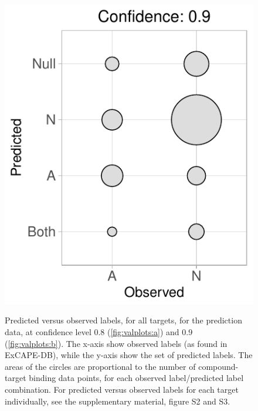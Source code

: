 \documentclass[utf8]{frontiersSCNS} %
\begin{document}
\begin{figure}[h!]
\begin{minipage}[c]{0.38\textwidth}
{        \includegraphics[width=1\textwidth]{figures/fig4b_alltargets_0p9_valplot.pdf}
    }\label{fig:valplots:b}
\end{minipage}
    \caption{Predicted versus observed labels, for all targets, for the
    prediction data, at confidence level 0.8 (\ref{fig:valplots:a}) and 0.9
    (\ref{fig:valplots:b}). The x-axis show observed labels (as found in
    ExCAPE-DB), while the y-axis show the set of predicted labels. The areas of
    the circles are proportional to the number of compound-target binding data
    points, for each observed label/predicted label combination.
    For predicted versus observed labels for each target individually, see
    the supplementary material, figure S2 and S3.}
    \label{fig:valplots}
\end{figure}
\end{document}
